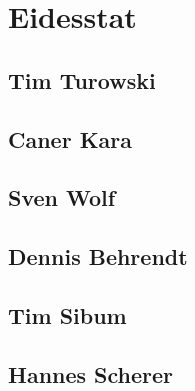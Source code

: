 \newpage

\tableofcontents

\newpage

\section{Eidesstat}
\subsection{Tim Turowski}

\newpage
\subsection{Caner Kara}

\newpage
\subsection{Sven Wolf}

\newpage
\subsection{Dennis Behrendt}

\newpage
\subsection{Tim Sibum}

\newpage
\subsection{Hannes Scherer}


